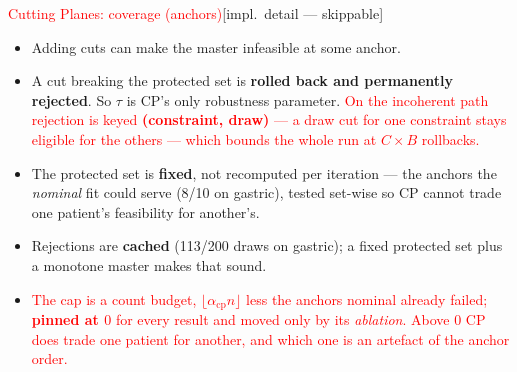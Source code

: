\documentclass{beamer}
\newcommand{\implnote}{\hfill{\normalfont\scriptsize\color{gray}[impl.\ detail --- skippable]}}
\newcommand{\mc}[1]{\textcolor{red}{#1}}
\begin{document}
\begin{frame}{\mc{Cutting Planes: coverage (anchors)}\implnote}
  \begin{itemize}
    \item Adding cuts can make the master infeasible at some anchor.
    \item A cut breaking the protected set is \textbf{rolled back and permanently
      rejected}. So $\tau$ is CP's only robustness parameter. \mc{On the
      incoherent path rejection is keyed \textbf{(constraint, draw)} --- a draw cut
      for one constraint stays eligible for the others --- which bounds the whole
      run at $C\times B$ rollbacks.}
    \item The protected set is \textbf{fixed}, not recomputed per iteration ---
      the anchors the \emph{nominal} fit could serve (8/10 on gastric), tested
      set-wise so CP cannot trade one patient's feasibility for another's.
    \item Rejections are \textbf{cached} (113/200 draws on gastric); a fixed
      protected set plus a monotone master makes that sound.
    \item \mc{The cap is a count budget, $\lfloor\alpha_{\text{cp}}n\rfloor$ less
      the anchors nominal already failed; \textbf{pinned at $0$} for every result
      and moved only by its \emph{ablation}. Above $0$ CP does trade one patient
      for another, and which one is an artefact of the anchor order.}
  \end{itemize}
\end{frame}
\end{document}

